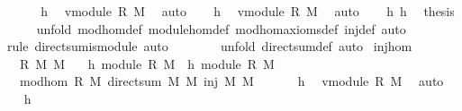 \begin{isabellebody}
\ {\isacharminus}\ \isanewline
\ \ \isamarkupfalse%
\ h{}\ \isamarkupfalse%
\ v{}{\isacharcolon}module\ R\ M{}\ \isamarkupfalse%
\ auto\isanewline
\ \ \isamarkupfalse%
\ h{}\ \isamarkupfalse%
\ v{}{\isacharcolon}module\ R\ M{}\ \isamarkupfalse%
\ auto\isanewline
\ \ \isamarkupfalse%
\ h{}\ h{}\ \isamarkupfalse%
\ {\isacharquery}thesis\isanewline
\ \ \ \ \isamarkupfalse%
\ {\isacharparenleft}unfold\ mod{\isacharunderscore}hom{\isacharunderscore}def\ module{\isacharunderscore}hom{\isacharunderscore}def\ mod{\isacharunderscore}hom{\isacharunderscore}axioms{\isacharunderscore}def\ inj{}{\isacharunderscore}def{\isacharcomma}\ auto{\isacharparenright}\isanewline
\ \ \ \ \ \ \ \isamarkupfalse%
\ {\isacharparenleft}rule\ direct{\isacharunderscore}sum{\isacharunderscore}is{\isacharunderscore}module{\isacharcomma}\ auto{\isacharparenright}\isanewline
\ \ \ \ \ \ \isamarkupfalse%
\ {\isacharparenleft}unfold\ direct{\isacharunderscore}sum{\isacharunderscore}def{\isacharcomma}\ auto{\isacharparenright}\isanewline
{}\isamarkupfalse%
%
\endisatagproof
{\isafoldproof}%
%
\isadelimproof
\isanewline
%
\endisadelimproof
\isanewline
{}\isamarkupfalse%
\ inj{}{\isacharunderscore}hom{\isacharcolon}\isanewline
\ \ \ R\ M{}\ M{}\isanewline
\ \ \ h{}{\isacharcolon}\ {\isachardoublequoteopen}module\ R\ M{}{\isachardoublequoteclose}\ \ h{}{\isacharcolon}\ {\isachardoublequoteopen}module\ R\ M{}{\isachardoublequoteclose}\isanewline
\ \ \ {\isachardoublequoteopen}mod{\isacharunderscore}hom\ R\ M{}\ {\isacharparenleft}direct{\isacharunderscore}sum\ M{}\ M{}{\isacharparenright}\ {\isacharparenleft}inj{}\ M{}\ M{}{\isacharparenright}{\isachardoublequoteclose}\isanewline
%
\isadelimproof
%
\endisadelimproof
%
\isatagproof
{}\isamarkupfalse%
\ {\isacharminus}\ \isanewline
\ \ \isamarkupfalse%
\ h{}\ \isamarkupfalse%
\ v{}{\isacharcolon}module\ R\ M{}\ \isamarkupfalse%
\ auto\isanewline
\ \ \isamarkupfalse%
\ h{}\ \isamarkupfalse%

\end{isabellebody}
